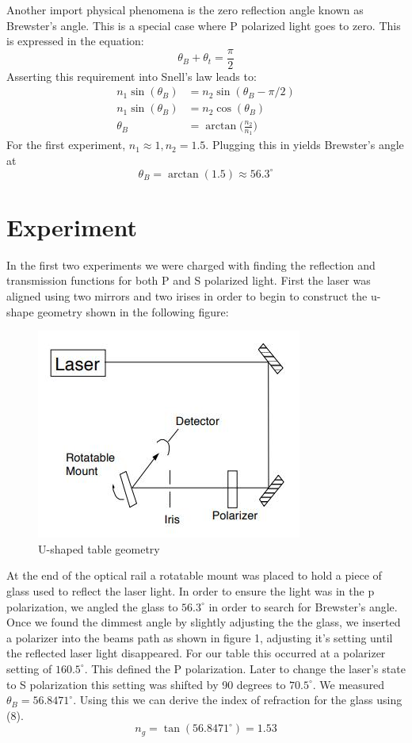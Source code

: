 \documentclass[letter, 11pt, onecolumn]{article}
\begin{document}
\noindent Another import physical phenomena is the zero reflection angle known as Brewster's angle. This is a special case where P polarized light goes to zero. This is expressed in the equation: 
	\begin{equation}
		\theta_B + \theta_t = \frac{\pi}{2}
	\end{equation} 
Asserting this requirement into Snell's law leads to: 
	\begin{align}
		n_1\sin(\theta_B) &= n_2\sin(\theta_B-\pi/2) \nonumber\\ 
		n_1\sin(\theta_B) &= n_2\cos(\theta_B) \nonumber\\ 
		\theta_B &= \arctan\Big(\frac{n_2}{n_1}\Big)
	\end{align}
For the first experiment, $n_1 \approx 1, n_2 = 1.5$. Plugging this in yields Brewster's angle at
	\begin{equation}
		\theta_B = \arctan(1.5) \approx 56.3^{\circ}
	\end{equation}
	
\section*{Experiment} 
In the first two experiments we were charged with finding the reflection and transmission functions for both P and S polarized light. First the laser was aligned using two mirrors and two irises in order to begin to construct the u-shape geometry shown in the following figure: 
	\begin{figure}[h!]
		\centering
		\includegraphics[width=0.45\columnwidth]{setup}
		\caption{U-shaped table geometry}
	\end{figure}
At the end of the optical rail a rotatable mount was placed to hold a piece of glass used to reflect the laser light. In order to ensure the light was in the p polarization, we angled the glass to $56.3^{\circ}$  in order to search for Brewster's angle. Once we found the dimmest angle by slightly adjusting the the glass, we inserted a polarizer into the beams path as shown in figure 1, adjusting it's setting until the reflected laser light disappeared. For our table this occurred at a polarizer setting of $160.5^{\circ}$. This defined the P polarization. Later to change the laser's state to S polarization this setting was shifted by 90 degrees to $70.5^{\circ}$. We measured $\theta_B = 56.8471^{\circ}$. Using this we can derive the index of refraction for the glass using (8). 
	\begin{equation}
		n_g = \tan(56.8471^{\circ}) = 1.53
	\end{equation}
	
\end{document}
